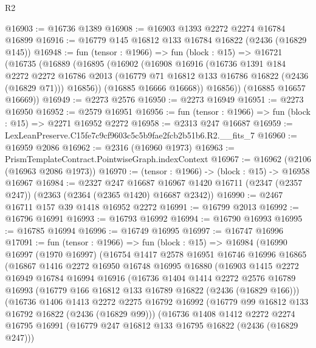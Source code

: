 \begin{lexlean}{R2}
\begin{coremodule}
@16903 := @16736 @1389
@16908 := @16903 @1393 @2272 @2274 @16784 @16899
@16916 := @16779 @145 @16812 @133 @16784 @16822 (@2436 (@16829 @145))
@16948 := fun (tensor : @1966) =>
  fun (block : @15) =>
  @16721
    (@16735
      (@16889
        (@16895
          (@16902
            (@16908
              @16916
              (@16736
                @1391
                @184
                @2272
                @2272
                @16786
                @2013
                (@16779 @71 @16812 @133 @16786 @16822 (@2436 (@16829 @71)))
                @16856))
            (@16885 @16666 @16668))
          @16856))
      (@16885 @16657 @16669))
@16949 := @2273 @2576
@16950 := @2273 @16949
@16951 := @2273 @16950
@16952 := @2579 @16951
@16956 := fun (tensor : @1966) => fun (block : @15) => @2271 @16952 @2272
@16958 := @2313 @247 @16687
@16959 := LexLeanPreserve.C15fe7c9cf9603c5c5b9fae2fcb2b51b6.R2.__fits_7
@16960 := @16959 @2086
@16962 := @2316 (@16960 @1973)
@16963 := PrismTemplateContract.PointwiseGraph.indexContext
@16967 := @16962 (@2106 (@16963 @2086 @1973))
@16970 := (tensor : @1966) -> (block : @15) -> @16958 @16967
@16984 := @2327
    @247
    @16687
    @16967
    @1420
    @16711
    (@2347 (@2357 @247))
    (@2363 (@2364 (@2365 @1420) @16687 @2342))
@16990 := @2467 @16711 @157 @39 @1418 @16952 @2272
@16991 := @16799 @2013
@16992 := @16796 @16991
@16993 := @16793 @16992
@16994 := @16790 @16993
@16995 := @16785 @16994
@16996 := @16749 @16995
@16997 := @16747 @16996
@17091 := fun (tensor : @1966) =>
  fun (block : @15) =>
  @16984
    (@16990
      @16997
      (@1970 @16997)
      (@16754
        @1417
        @2578
        @16951
        @16746
        @16996
        @16865
        (@16867
          @1416
          @2272
          @16950
          @16748
          @16995
          @16880
          (@16903
            @1415
            @2272
            @16949
            @16784
            @16994
            @16916
            (@16736
              @1404
              @1414
              @2272
              @2576
              @16789
              @16993
              (@16779 @166 @16812 @133 @16789 @16822 (@2436 (@16829 @166)))
              (@16736
                @1406
                @1413
                @2272
                @2275
                @16792
                @16992
                (@16779 @99 @16812 @133 @16792 @16822 (@2436 (@16829 @99)))
                (@16736
                  @1408
                  @1412
                  @2272
                  @2274
                  @16795
                  @16991
                  (@16779 @247 @16812 @133 @16795 @16822 (@2436 (@16829 @247)))

\end{coremodule}
\end{lexlean}
